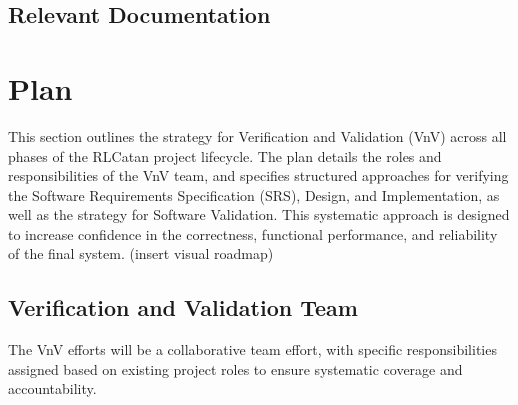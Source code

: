 \documentclass[12pt, titlepage]{article}
\begin{document}
\subsection{Relevant Documentation}


\citet{SRS}


\section{Plan}


This section outlines the strategy for Verification and Validation (VnV) across all phases of the RLCatan project lifecycle.
The plan details the roles and responsibilities of the VnV team, and specifies structured approaches for verifying the Software Requirements Specification (SRS), Design, and Implementation, as well as the strategy for Software Validation.
This systematic approach is designed to increase confidence in the correctness, functional performance, and reliability of the final system.
(insert visual roadmap)


\subsection{Verification and Validation Team}



The VnV efforts will be a collaborative team effort, with specific responsibilities assigned based on existing project roles to ensure systematic coverage and accountability.
\end{document}
